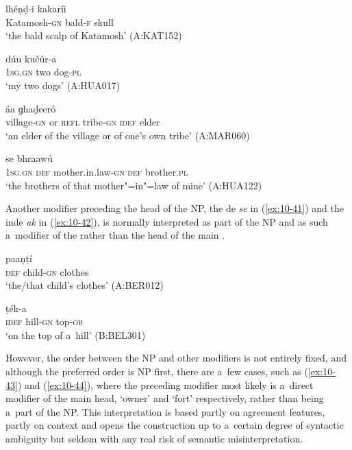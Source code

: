 \begin{exe}
\ex
\label{ex:10-37}
\gll [kaṭamuš-íi] lhéṇḍ-i kakaríi \\
Katamosh-\textsc{gn} bald-\textsc{f} skull \\
\glt `the bald scalp of Katamosh' (A:KAT152)

\ex
\label{ex:10-38}
\gll [míi] dúu kučúr-a \\
\textsc{1sg.gn} two dog-\textsc{pl}  \\
\glt `my two dogs' (A:HUA017)

\ex
\label{ex:10-39}
 áa ɡhaḍeeró  \\
village-\textsc{gn} or \textsc{refl} tribe-\textsc{gn} \textsc{idef} elder \\
\glt `an elder of the village or of one's own tribe' (A:MAR060)

\ex
\label{ex:10-40}
 se bhraawú \\
\textsc{1sg.gn} \textsc{def} mother.in.law-\textsc{gn} \textsc{def} brother.\textsc{pl}  \\
\glt `the brothers of that mother"=in"=law of mine' (A:HUA122)
\end{exe}


Another modifier preceding the head of the  NP, the de \textit{se} in (\ref{ex:10-41}) and the inde \textit{ak} in (\ref{ex:10-42}), is normally interpreted as part of the  NP and as such a~modifier of the   rather than the head of the main  .

\begin{exe}
\ex
\label{ex:10-41}
\gll [se kuṇaak-íi] paaṇṭí \\
\textsc{def} child-\textsc{gn} clothes  \\
\glt `the/that child's clothes' (A:BER012)

\ex
\label{ex:10-42}
\gll [ak táapeṛ-e] ṭék-a \\
\textsc{idef} hill-\textsc{gn} top-\textsc{ob}  \\
\glt `on the top of a~hill' (B:BEL301)
\end{exe}


However, the order between the  NP and other modifiers is not entirely fixed, and although the preferred order is  NP first, there are a~few cases, such as (\ref{ex:10-43}) and (\ref{ex:10-44}), where the preceding modifier most likely is a~direct modifier of the main  head, `owner' and `fort' respectively, rather than being a~part of the  NP. This interpretation is based partly on agreement features, partly on context and opens the construction up to a~certain degree of syntactic ambiguity but seldom with any real risk of semantic misinterpretation.

